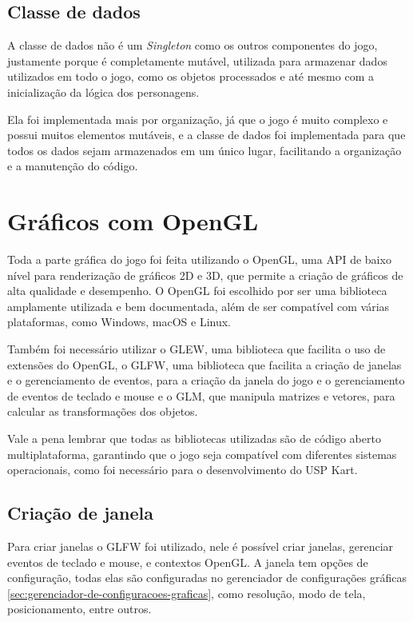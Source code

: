 \subsection{Classe de dados}

A classe de dados não é um \textit{Singleton} como os outros componentes do jogo, justamente porque é completamente mutável, utilizada para armazenar dados utilizados em todo o jogo, como os objetos processados e até mesmo com a inicialização da lógica dos personagens.

Ela foi implementada mais por organização, já que o jogo é muito complexo e possui muitos elementos mutáveis, e a classe de dados foi implementada para que todos os dados sejam armazenados em um único lugar, facilitando a organização e a manutenção do código.

\section{Gráficos com OpenGL}

Toda a parte gráfica do jogo foi feita utilizando o OpenGL, uma API de baixo nível para renderização de gráficos 2D e 3D, que permite a criação de gráficos de alta qualidade e desempenho. O OpenGL foi escolhido por ser uma biblioteca amplamente utilizada e bem documentada, além de ser compatível com várias plataformas, como Windows, macOS e Linux.

Também foi necessário utilizar o GLEW, uma biblioteca que facilita o uso de extensões do OpenGL, o GLFW, uma biblioteca que facilita a criação de janelas e o gerenciamento de eventos, para a criação da janela do jogo e o gerenciamento de eventos de teclado e mouse e o GLM, que manipula matrizes e vetores, para calcular as transformações dos objetos.

Vale a pena lembrar que todas as bibliotecas utilizadas são de código aberto multiplataforma, garantindo que o jogo seja compatível com diferentes sistemas operacionais, como foi necessário para o desenvolvimento do USP Kart.

\subsection{Criação de janela}

Para criar janelas o GLFW foi utilizado, nele é possível criar janelas, gerenciar eventos de teclado e mouse, e  contextos OpenGL. A janela tem opções de configuração, todas elas são configuradas no gerenciador de configurações gráficas \ref{sec:gerenciador-de-configuracoes-graficas}, como resolução, modo de tela, posicionamento, entre outros.

